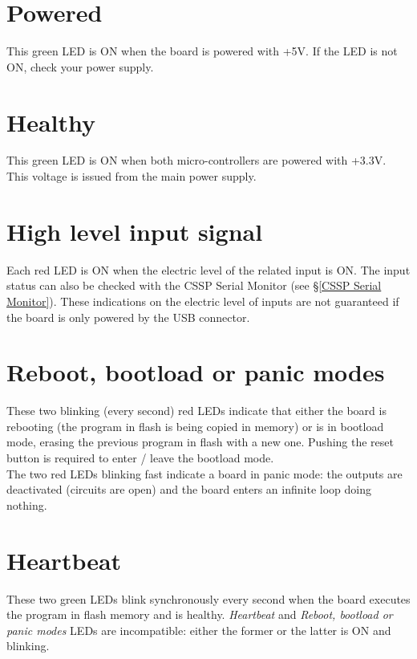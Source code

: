 \section{Powered}

This green LED is ON when the board is powered with +5V.
If the LED is not ON, check your power supply.

\section{Healthy}

This green LED is ON when both micro-controllers are powered with +3.3V. This voltage is issued from the main power supply. 

\section{High level input signal}

Each red LED is ON when the electric level of the related input is ON. The input status can also be checked with the CSSP Serial Monitor (see §\ref{CSSP Serial Monitor}).
These indications on the electric level of inputs are not guaranteed if the board is only powered by the USB connector.

\section{Reboot, bootload or panic modes}

These two blinking (every second) red LEDs indicate that either the board is rebooting (the program in flash is being copied in memory) or is in bootload mode, erasing the previous program in flash with a new one. Pushing the reset button is required to enter / leave the bootload mode.  \\
The two red LEDs blinking fast indicate a board in panic mode: the outputs are deactivated (circuits are open) and the board enters an infinite loop doing nothing.

\section{Heartbeat}

These two green LEDs blink synchronously every second when the board executes the program in flash memory and is healthy.
\textit{Heartbeat} and \textit{Reboot, bootload or panic modes} LEDs are incompatible: either the former or the latter is ON and blinking.

